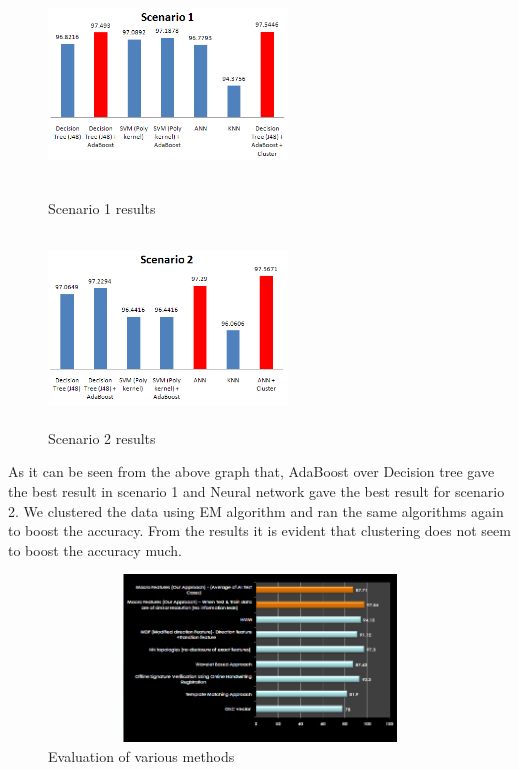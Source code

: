 \documentclass{article}
\begin{document}
\begin{figure}[ht]
    \begin{minipage}[b]{0.5\linewidth}
        \centering
        \includegraphics[width=2.5in, height=2in]{Test1.png}
        \caption{Scenario 1 results}
        \label{fig:figure1}
    \end{minipage}
    \hspace{0.5cm}
    \begin{minipage}[b]{0.5\linewidth}
        \centering
        \includegraphics[width=2.5in, height=2in]{Test2.png}
        \caption{Scenario 2 results}
        \label{fig:figure2}
    \end{minipage}
\end{figure}

As it can be seen from the above graph that, AdaBoost over Decision tree gave the best result in scenario 1 and Neural network gave the best result for scenario 2. We clustered the data using EM algorithm and ran the same algorithms again to boost the accuracy. From the results it is evident that clustering does not seem to boost the accuracy much.

\begin{figure}[ht]
	\begin{center}
        		\includegraphics[width=4.5in, height=1.75in]{comparisons.png}
       		 \caption{Evaluation of various methods}
	\end{center}
\end{figure}
\end{document}
